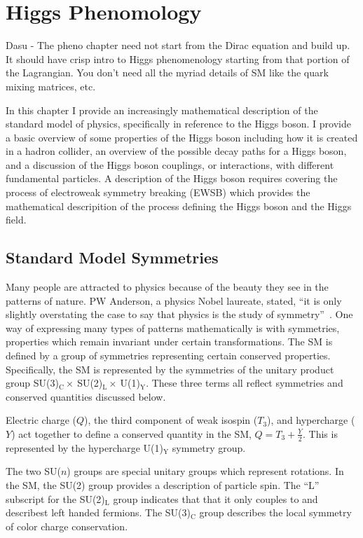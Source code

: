 \chapter{Higgs Phenomology}
\label{sec:pheno}

Dasu -
The pheno chapter need not start from the Dirac equation and build up. It should have crisp intro to Higgs phenomenology starting from that portion of the Lagrangian. You don’t need all the myriad details of SM like the quark mixing matrices, etc.


In this chapter I provide an increasingly mathematical description of the standard model
of physics, specifically in reference to the Higgs boson. I provide a basic overview of some 
properties of the Higgs boson including how it is created in a hadron collider, an overview
of the possible decay paths for a Higgs boson, and a discussion of the Higgs boson
couplings, or interactions, with different fundamental particles. A description of the
Higgs boson requires covering the process of electroweak symmetry breaking (EWSB) which
provides the mathematical descripition of the process defining the Higgs boson and the
Higgs field.

\section{Standard Model Symmetries}
Many people are attracted to physics because of the beauty they see in the patterns of nature.
PW Anderson, a physics Nobel laureate, stated, ``it is only slightly overstating the case 
to say that physics is the study of symmetry''~\cite{pw_anderson:1972}.
One way of expressing many types of patterns mathematically is with symmetries, properties which 
remain invariant under certain transformations. The SM is defined by a group of symmetries
representing certain conserved properties. Specifically, the SM is represented by  the
symmetries of the unitary product group SU(3)$_{\text{C}} \times$ SU(2)$_{\text{L}} \times$ U(1)$_{\text{Y}}$.
These three terms all reflect symmetries and conserved quantities discussed below.

Electric charge ($Q$), the third component of weak isospin ($T_{3}$), and hypercharge ($Y$) act together to define a conserved 
quantity in the SM, $Q = T_{3} + \frac{Y}{2}$. This is represented by the
hypercharge U(1)$_{\text{Y}}$ symmetry group.

The two SU($n$) groups are special unitary groups which represent rotations.
In the SM, the SU(2) group provides a description of particle spin.
The ``L'' subscript for the SU(2)$_{\text{L}}$ group indicates that that it only couples to
and describest left handed fermions.
The SU(3)$_{\text{C}}$ group describes the local symmetry of color charge conservation.


